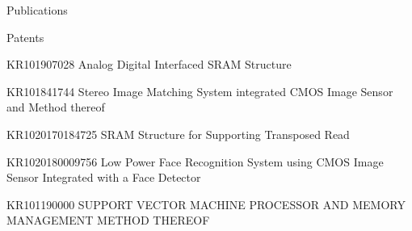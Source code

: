 \documentclass{resume} %
\begin{document}
\begin{section}{Publications}
\begin{subsection}{Patents}{}{}{}
\item {\small KR101907028 Analog Digital Interfaced SRAM Structure}

\item {\small KR101841744 Stereo Image Matching System integrated CMOS Image Sensor and Method thereof}

\item {\small KR1020170184725 SRAM Structure for Supporting Transposed Read}

\item {\small KR1020180009756 Low Power Face Recognition System using CMOS Image Sensor Integrated with a Face Detector}

\item {\small KR101190000 SUPPORT VECTOR MACHINE PROCESSOR AND MEMORY MANAGEMENT METHOD THEREOF}

\end{subsection}

\end{section}













\end{document}

